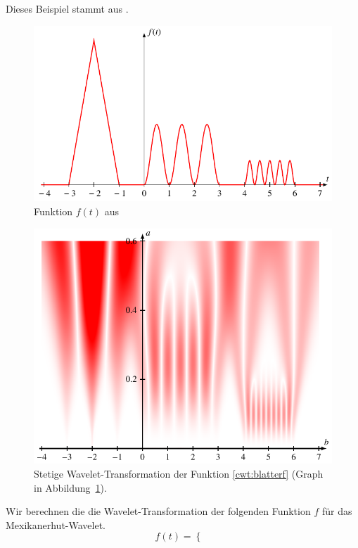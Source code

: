 \begin{beispiel}
Dieses Beispiel stammt aus \cite[p.~60]{buch:blatter}.
\begin{figure}
\centering
\includegraphics{chapters/4-cwt/images/f.pdf}
\caption{Funktion $f(t)$ aus \cite[p.~60]{buch:blatter}
\label{cwt:blatterfgraph}}
\end{figure}
\begin{figure}
\centering
\includegraphics{chapters/4-cwt/images/notes.pdf}
\caption{Stetige Wavelet-Transformation der Funktion \eqref{cwt:blatterf}
(Graph in Abbildung~\ref{cwt:blatterfgraph}).
\label{cwt:blattercwt}}
\end{figure}
Wir berechnen die die Wavelet-Transformation der folgenden Funktion $f$
für das Mexikanerhut-Wavelet.
\begin{equation}
f(t) = \begin{cases}

\end{cases}
\end{equation}
\end{beispiel}
